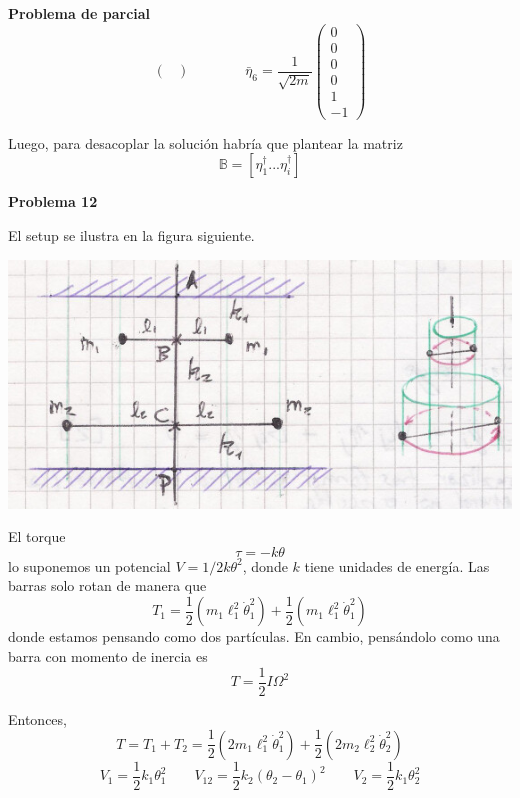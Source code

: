 \documentclass[10pt,oneside]{CBFT_book}
\begin{document}
\begin{ejemplo}{\bf Problema de parcial}
\[\begin{pmatrix}
	                                     \end{pmatrix} \qquad \qquad
	\bar{\eta}_6 = \frac{1}{\sqrt{2m}} \begin{pmatrix} 0 \\ 0 \\ 0 \\ 0 \\ 1 \\ -1
	                                     \end{pmatrix}
\] 
 
Luego, para desacoplar la solución habría que plantear la matriz
\[
	\mathbb{B} = [ \eta^\dagger_1 ... \eta_i^\dagger ]
\]
 
\end{ejemplo}

\begin{ejemplo}{\bf Problema 12}

El setup se ilustra en la figura siguiente.

\includegraphics[scale=0.5]{images/fig_mc_problema_12.jpg}

El torque 
\[
	\tau = - k \theta
\]
lo suponemos un potencial $ V = 1/2 k \theta^2 $, donde $k$ tiene unidades de energía.
Las barras solo rotan de manera que 
\[
	T_1 = \frac{1}{2} ( m_1 \ell_1^2 \dot{\theta}_1^2  ) + \frac{1}{2}( m_1 \ell_1^2 \dot{\theta}^2_1 )
\]
donde estamos pensando como dos partículas. En cambio, pensándolo como una barra con momento de inercia es
\[
	T = \frac{1}{2} I \Omega^2
\]

Entonces,
\[
	T = T_1 + T_2 = \frac{1}{2} ( 2 m_1 \ell_1^2 \dot{\theta}_1^2  ) + \frac{1}{2}( 2 m_2 \ell_2^2 \dot{\theta}^2_2 )
\]
\[
	V_1 = \frac{1}{2} k_1 \theta^2_1 \qquad 
	V_{12} = \frac{1}{2} k_2 ( \theta_2 - \theta_1 )^2  \qquad 
	V_2 = \frac{1}{2} k_1 \theta^2_2 
\]


\end{ejemplo}
\end{document}
